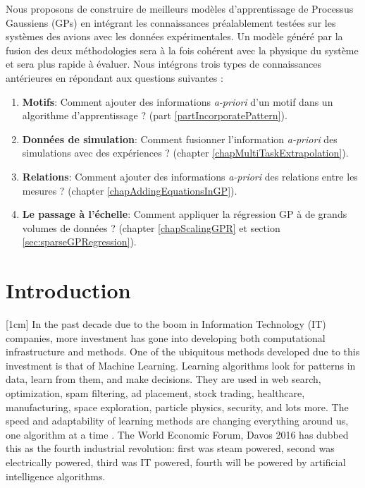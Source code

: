 \begin{mdframed}[hidealllines=true,backgroundcolor=lightgray!20]
Nous proposons de construire de meilleurs modèles d'apprentissage de Processus Gaussiens (GPs) en intégrant les connaissances préalablement testées sur les systèmes des avions avec les données expérimentales. Un modèle généré par la fusion des deux méthodologies sera à la fois cohérent avec la physique du système et sera plus rapide à évaluer. Nous intégrons trois types de connaissances antérieures en répondant aux questions suivantes :

\begin{enumerate}
\item \textbf{Motifs}: Comment ajouter des informations \textit{a-priori} d'un motif dans un algorithme d'apprentissage ? (part \ref{partIncorporatePattern}).
\item \textbf{Données de simulation}: Comment fusionner l'information \textit{a-priori} des simulations avec des expériences ? (chapter \ref{chapMultiTaskExtrapolation}). 
\item \textbf{Relations}: Comment ajouter des informations \textit{a-priori} des relations entre les mesures ? (chapter \ref{chapAddingEquationsInGP}).
\item \textbf{Le passage à l'échelle}: Comment appliquer la régression GP à de grands volumes de données ? (chapter \ref{chapScalingGPR} et section \ref{sec:sparseGPRegression}).
\end{enumerate}

\end{mdframed}



\section{Introduction}
[1cm]
In the past decade due to the boom in Information Technology (IT) companies, more investment has gone into developing both computational infrastructure and methods. One of the ubiquitous methods developed due to this investment is that of Machine Learning. Learning algorithms look for patterns in data, learn from them, and make decisions. They are used in web search, optimization, spam filtering, ad placement, stock trading, healthcare, manufacturing, space exploration, particle physics, security, and lots more. The speed and adaptability of learning methods are changing everything around us, one algorithm at a time \cite{domingos2015master}. The World Economic Forum, Davos 2016 \cite{schwab2016fourth} has dubbed this as the fourth industrial revolution: first was steam powered, second was electrically powered, third was IT powered, fourth will be powered by artificial intelligence algorithms.

